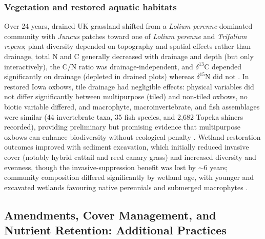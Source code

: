 \documentclass[11pt]{article}
\begin{document}
\subsubsection{Vegetation and restored aquatic habitats}
Over 24 years, drained UK grassland shifted from a \textit{Lolium perenne}-dominated community with \textit{Juncus} patches toward one of \textit{Lolium perenne} and \textit{Trifolium repens}; plant diversity depended on topography and spatial effects rather than drainage, total N and C generally decreased with drainage and depth (but only interactively), the C/N ratio was drainage-independent, and $\delta^{13}$C depended significantly on drainage (depleted in drained plots) whereas $\delta^{15}$N did not \parencite{Harris2018}. In restored Iowa oxbows, tile drainage had negligible effects: physical variables did not differ significantly between multipurpose (tiled) and non-tiled oxbows, no biotic variable differed, and macrophyte, macroinvertebrate, and fish assemblages were similar (44 invertebrate taxa, 35 fish species, and 2{,}682 Topeka shiners recorded), providing preliminary but promising evidence that multipurpose oxbows can enhance biodiversity without ecological penalty \parencite{Leberg2024}. Wetland restoration outcomes improved with sediment excavation, which initially reduced invasive cover (notably hybrid cattail and reed canary grass) and increased diversity and evenness, though the invasive-suppression benefit was lost by $\sim$6 years; community composition differed significantly by wetland age, with younger and excavated wetlands favouring native perennials and submerged macrophytes \parencite{Winikoff2020}.

\subsection{Amendments, Cover Management, and Nutrient Retention: Additional Practices}
\end{document}
